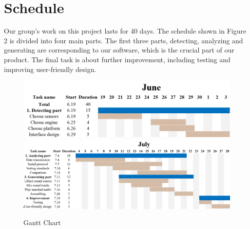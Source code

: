 \section{Schedule}
Our group's work on this project lasts for 40 days. The schedule shown in Figure
2 is divided into four main parts. The first three parts, detecting, analyzing
and generating are corresponding to our software, which is the crucial part of
our product. The final task is about further improvement, including testing and
improving user-friendly design. 
\begin{figure}[H]
    \includegraphics[width=11.5cm]{Pics/Gantt}
    \includegraphics[width=16cm]{Pics/Gantt1}
    \caption{Gantt Chart}
    \label{scalerStep}
\end{figure}
